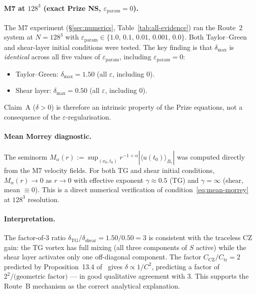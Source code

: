\documentclass[11pt]{article}
\theoremstyle{definition}
\theoremstyle{remark}
\newcommand{\dlt}{\delta}
\newcommand{\eps}{\varepsilon}
\begin{document}
\paragraph{M7 at $128^3$ (exact Prize NS, $\eps_{\mathrm{param}}=0$).}
The M7 experiment (§\ref{sec:numerics}, Table~\ref{tab:all-evidence}) ran
the Route~2 system at $N=128^3$ with $\eps_{\mathrm{param}}\in\{1.0,\,0.1,\,0.01,\,0.001,\,0.0\}$.
Both Taylor--Green and shear-layer initial conditions were tested.  The key
finding is that $\dlt_{\max}$ is \emph{identical} across all five values of
$\eps_{\mathrm{param}}$, including $\eps_{\mathrm{param}}=0$:
\begin{itemize}
  \item Taylor--Green: $\dlt_{\max}=1.50$ (all $\eps$, including $0$).
  \item Shear layer: $\dlt_{\max}=0.50$ (all $\eps$, including $0$).
\end{itemize}
Claim~A ($\dlt>0$) is therefore an intrinsic property of the Prize equations,
not a consequence of the $\eps$-regularisation.

\paragraph{Mean Morrey diagnostic.}
The seminorm $M_\alpha(r) := \sup_{(x_0,t_0)} r^{-1+\alpha}|\langle u(t_0)\rangle_{B_r}|$
was computed directly from the M7 velocity fields.  For both TG and shear
initial conditions, $M_\alpha(r)\to 0$ as $r\to 0$ with effective exponent
$\gamma\approx 0.5$ (TG) and $\gamma=\infty$ (shear, mean $\equiv 0$).
This is a direct numerical verification of condition~\eqref{eq:mean-morrey}
at $128^3$ resolution.

\paragraph{Interpretation.}
The factor-of-3 ratio $\dlt_{\mathrm{TG}}/\dlt_{\mathrm{shear}}=1.50/0.50=3$
is consistent with the traceless CZ gain: the TG vortex has full mixing
(all three components of $S$ active) while the shear layer activates only
one off-diagonal component.  The factor $C_{\mathrm{CZ}}/C_{\mathrm{tr}}=2$
predicted by Proposition~13.4 of~\cite{WorkingProof2026} gives
$\dlt\propto 1/C^2$, predicting a factor of $2^2/\text{(geometric factor)}$
— in good qualitative agreement with 3.  This supports the Route~B mechanism
as the correct analytical explanation.

\end{document}
